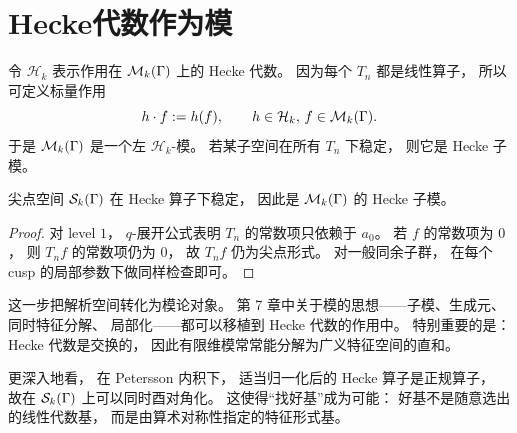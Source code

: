 \section{Hecke代数作为模}
\begin{definition}
令 $\mathcal{H}_k$ 表示作用在 $\mathcal{M}_k(\Gamma)$ 上的 Hecke 代数。
因为每个 $T_n$ 都是线性算子，
所以可定义标量作用
\[ h\cdot f:=h(f),\qquad h\in \mathcal{H}_k,\, f\in \mathcal{M}_k(\Gamma). \]
于是 $\mathcal{M}_k(\Gamma)$ 是一个左 $\mathcal{H}_k$-模。
若某子空间在所有 $T_n$ 下稳定，
则它是 Hecke 子模。
\end{definition}
\begin{proposition}
尖点空间 $\mathcal{S}_k(\Gamma)$ 在 Hecke 算子下稳定，
因此是 $\mathcal{M}_k(\Gamma)$ 的 Hecke 子模。
\end{proposition}
\begin{proof}
对 level $1$，
$q$-展开公式表明
$T_n$ 的常数项只依赖于 $a_0$。
若 $f$ 的常数项为 $0$，
则 $T_n f$ 的常数项仍为 $0$，
故 $T_n f$ 仍为尖点形式。
对一般同余子群，
在每个 cusp 的局部参数下做同样检查即可。
\end{proof}
这一步把解析空间转化为模论对象。 第 7 章中关于模的思想——子模、生成元、同时特征分解、 局部化——都可以移植到 Hecke 代数的作用中。 特别重要的是： Hecke 代数是交换的， 因此有限维模常常能分解为广义特征空间的直和。
\begin{remark}
更深入地看，
在 Petersson 内积下，
适当归一化后的 Hecke 算子是正规算子，
故在 $\mathcal{S}_k(\Gamma)$ 上可以同时酉对角化。
这使得“找好基”成为可能：
好基不是随意选出的线性代数基，
而是由算术对称性指定的特征形式基。
\end{remark}
